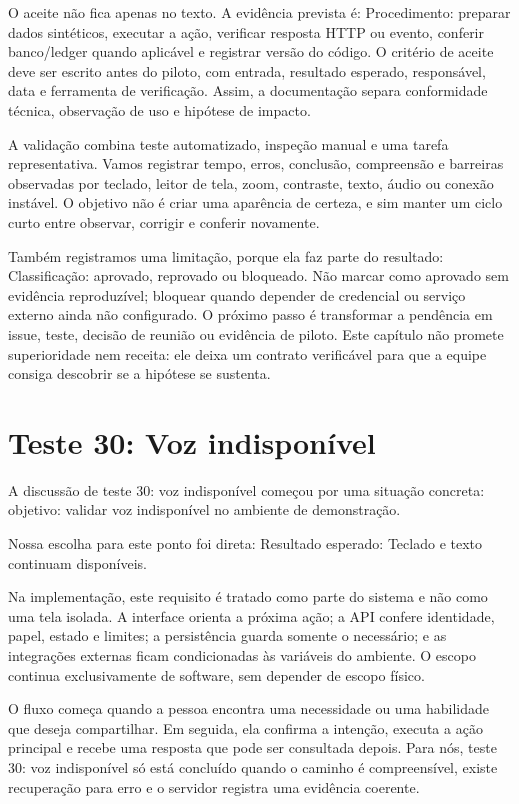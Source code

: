 \documentclass[12pt,oneside,a4paper,article]{abntex2}
\begin{document}
O aceite não fica apenas no texto. A evidência prevista é: Procedimento: preparar dados sintéticos, executar a ação, verificar resposta HTTP ou evento, conferir banco/ledger quando aplicável e registrar versão do código. O critério de aceite deve ser escrito antes do piloto, com entrada, resultado esperado, responsável, data e ferramenta de verificação. Assim, a documentação separa conformidade técnica, observação de uso e hipótese de impacto.

A validação combina teste automatizado, inspeção manual e uma tarefa representativa. Vamos registrar tempo, erros, conclusão, compreensão e barreiras observadas por teclado, leitor de tela, zoom, contraste, texto, áudio ou conexão instável. O objetivo não é criar uma aparência de certeza, e sim manter um ciclo curto entre observar, corrigir e conferir novamente.

Também registramos uma limitação, porque ela faz parte do resultado: Classificação: aprovado, reprovado ou bloqueado. Não marcar como aprovado sem evidência reproduzível; bloquear quando depender de credencial ou serviço externo ainda não configurado. O próximo passo é transformar a pendência em issue, teste, decisão de reunião ou evidência de piloto. Este capítulo não promete superioridade nem receita: ele deixa um contrato verificável para que a equipe consiga descobrir se a hipótese se sustenta.

\section{Teste 30: Voz indisponível}
A discussão de teste 30: voz indisponível começou por uma situação concreta: objetivo: validar voz indisponível no ambiente de demonstração.

Nossa escolha para este ponto foi direta: Resultado esperado: Teclado e texto continuam disponíveis.

Na implementação, este requisito é tratado como parte do sistema e não como uma tela isolada. A interface orienta a próxima ação; a API confere identidade, papel, estado e limites; a persistência guarda somente o necessário; e as integrações externas ficam condicionadas às variáveis do ambiente. O escopo continua exclusivamente de software, sem depender de escopo físico.

O fluxo começa quando a pessoa encontra uma necessidade ou uma habilidade que deseja compartilhar. Em seguida, ela confirma a intenção, executa a ação principal e recebe uma resposta que pode ser consultada depois. Para nós, teste 30: voz indisponível só está concluído quando o caminho é compreensível, existe recuperação para erro e o servidor registra uma evidência coerente.
\end{document}
